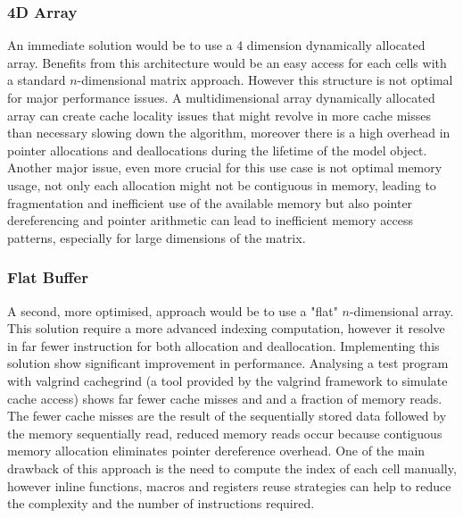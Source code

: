 \subsubsection{4D Array}\label{sec:4d_array}
An immediate solution would be to use a 4 dimension dynamically allocated array. 
Benefits from this architecture would be an easy access for each cells with a standard $n$-dimensional matrix approach.
However this structure is not optimal for major performance issues.
A multidimensional array dynamically allocated array can create cache locality issues that might revolve in more cache misses
than necessary slowing down the algorithm, moreover there is a high overhead in pointer allocations and deallocations during the lifetime of the model object.
Another major issue, even more crucial for this use case is not optimal memory usage, not only each allocation might not be contiguous in memory, leading to fragmentation and inefficient use of the available memory but also
pointer dereferencing and pointer arithmetic can lead to inefficient memory access patterns, especially for large dimensions of the matrix.

\subsubsection{Flat Buffer}\label{sec:flat_buf}
A second, more optimised, approach would be to use a "flat" $n$-dimensional array.
This solution require a more advanced indexing computation, however it resolve in far fewer instruction for both allocation and deallocation.
Implementing this solution show significant improvement in performance. Analysing a test program with valgrind cachegrind
 (a tool provided by the valgrind framework to simulate cache access) shows far fewer cache misses and and a fraction of memory reads.
The fewer cache misses are the result of the sequentially stored data followed by the memory sequentially read, reduced memory reads occur because contiguous memory allocation eliminates pointer dereference overhead.
One of the main drawback of this approach is the need to compute the index of each cell manually, however inline functions, macros and registers reuse strategies can help to reduce the complexity and the number of instructions required.

